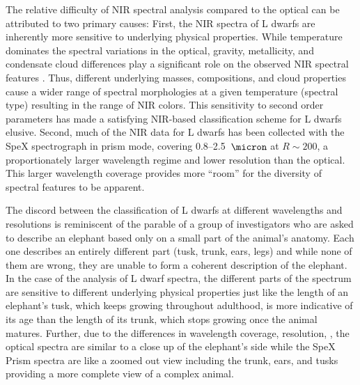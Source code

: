 \documentclass[modern,trackchanges]{aastex61}
\begin{document}
The relative difficulty of NIR spectral analysis compared to the optical can be attributed to two primary causes:
First, the NIR spectra of L dwarfs are inherently more sensitive to underlying physical properties.
While temperature dominates the spectral variations in the optical, gravity, metallicity, and condensate cloud differences play a significant role on the observed NIR spectral features \citep{Jones:1997hb,Knapp04}.
Thus, different underlying masses, compositions, and cloud properties cause a wider range of spectral morphologies at a given temperature (spectral type) resulting in the range of NIR colors.
This sensitivity to second order parameters has made a satisfying NIR-based classification scheme for L dwarfs elusive.
Second, much of the NIR data for L dwarfs has been collected with the SpeX spectrograph in prism mode, covering 0.8--2.5~$\micron$ at $R\sim200$, a proportionately larger wavelength regime and lower resolution than the optical.
This larger wavelength coverage provides more ``room'' for the diversity of spectral features to be apparent.

The discord between the classification of L dwarfs at different wavelengths and resolutions is reminiscent of the parable of a group of investigators who are asked to describe an elephant based only on a small part of the animal's anatomy.
Each one describes an entirely different part (tusk, trunk, ears, legs) and while none of them are wrong, they are unable to form a coherent description of the elephant.
In the case of the analysis of L dwarf spectra, the different parts of the spectrum are sensitive to different underlying physical properties just like the length of an elephant's tusk, which keeps growing throughout adulthood, is more indicative of its age than the length of its trunk, which stops growing once the animal matures.
Further, due to the differences in wavelength coverage, resolution, , the optical spectra are similar to a close up of the elephant's side while the SpeX Prism spectra are like a zoomed out view including the trunk, ears, and tusks providing a more complete view of a complex animal.
\end{document}
